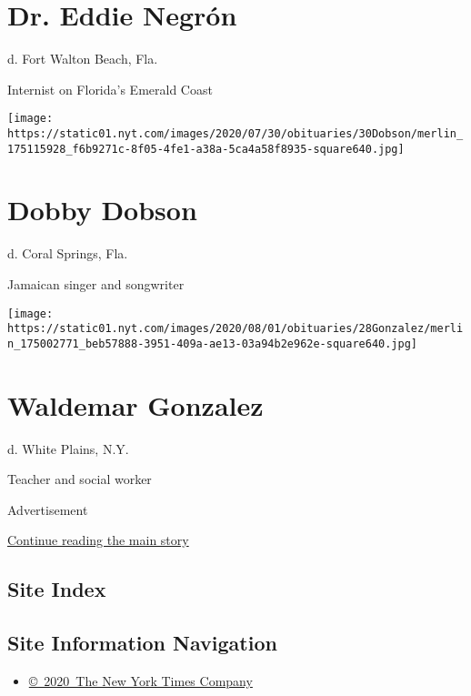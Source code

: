 \hypertarget{dr-eddie-negruxf3n}{%
\section{Dr. Eddie Negrón}\label{dr-eddie-negruxf3n}}

d. Fort Walton Beach, Fla.

Internist on Florida's Emerald Coast

\texttt{[image: https://static01.nyt.com/images/2020/07/30/obituaries/30Dobson/merlin\_175115928\_f6b9271c-8f05-4fe1-a38a-5ca4a58f8935-square640.jpg]}

\hypertarget{dobby-dobson}{%
\section{Dobby Dobson}\label{dobby-dobson}}

d. Coral Springs, Fla.

Jamaican singer and songwriter

\texttt{[image: https://static01.nyt.com/images/2020/08/01/obituaries/28Gonzalez/merlin\_175002771\_beb57888-3951-409a-ae13-03a94b2e962e-square640.jpg]}

\hypertarget{waldemar-gonzalez}{%
\section{Waldemar Gonzalez}\label{waldemar-gonzalez}}

d. White Plains, N.Y.

Teacher and social worker

Advertisement

\protect\hyperlink{after-bottom}{Continue reading the main story}

\hypertarget{site-index}{%
\subsection{Site Index}\label{site-index}}

\hypertarget{site-information-navigation}{%
\subsection{Site Information
Navigation}\label{site-information-navigation}}

\begin{itemize}
\tightlist
\item
  \href{https://help.nytimes.com/hc/en-us/articles/115014792127-Copyright-notice}{©~2020~The
  New York Times Company}
\end{itemize}

